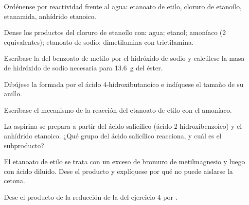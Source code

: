 \begin{exercise}[$\star$]\label{exo:b2:acyl-substitution:1}
Ordénense por reactividad frente al agua: etanoato de etilo, cloruro de etanoílo, etanamida, anhídrido
etanoico.
\end{exercise}

\begin{exercise}[$\star$]\label{exo:b2:acyl-substitution:2}
Dense los productos del cloruro de etanoílo con: agua; etanol; amoníaco (2 equivalentes);
etanoato de sodio; dimetilamina con trietilamina.
\end{exercise}

\begin{exercise}[$\star$]\label{exo:b2:acyl-substitution:3}
Escríbase la  del benzoato de metilo por el hidróxido de sodio y calcúlese la masa de hidróxido
de sodio necesaria para \qty{13.6}{g} del éster.
\end{exercise}

\begin{exercise}[$\star$]\label{exo:b2:acyl-substitution:4}
Dibújese la  formada por el ácido 4-hidroxibutanoico e indíquese el tamaño de su anillo.
\end{exercise}

\begin{exercise}[$\star\star$]\label{exo:b2:acyl-substitution:5}
Escríbase el mecanismo de la reacción del etanoato de etilo con el amoníaco.
\end{exercise}

\begin{exercise}[$\star\star$]\label{exo:b2:acyl-substitution:6}
La aspirina se prepara a partir del ácido salicílico (ácido 2-hidroxibenzoico) y el anhídrido etanoico. ¿Qué grupo
del ácido salicílico reacciona, y cuál es el subproducto?
\end{exercise}

\begin{exercise}[$\star\star$]\label{exo:b2:acyl-substitution:7}
El etanoato de etilo se trata con un exceso de bromuro de metilmagnesio y luego con ácido diluido. Dese el
producto y explíquese por qué no puede aislarse la cetona.
\end{exercise}

\begin{exercise}[$\star\star$]\label{exo:b2:acyl-substitution:8}
Dese el producto de la reducción de la  del ejercicio 4 por .
\end{exercise}

